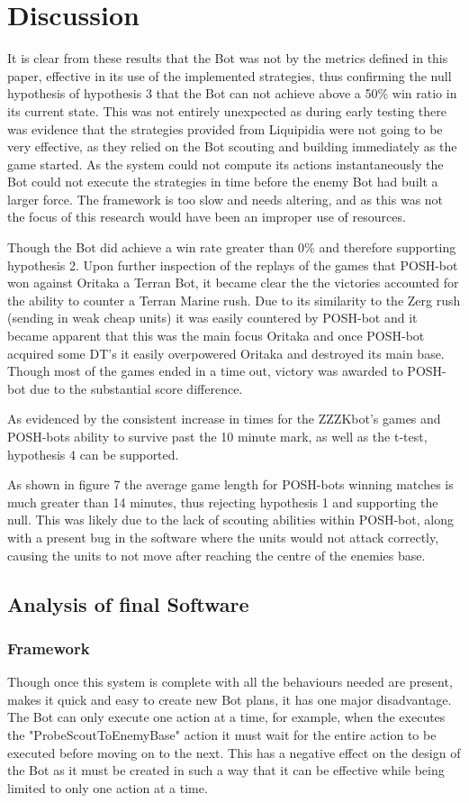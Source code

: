 \documentclass[journal]{IEEEtran}
\begin{document}
\section{Discussion}
It is clear from these results that the Bot was not by the metrics defined in this paper, effective in its use of the implemented strategies, thus confirming the null hypothesis of hypothesis 3 that the Bot can not achieve above a 50\% win ratio in its current state. This was not entirely unexpected as during early testing there was evidence that the strategies provided from Liquipidia were not going to be very effective, as they relied on the Bot scouting and building immediately as the game started. As the system could not compute its actions instantaneously the Bot could not execute the strategies in time before the enemy Bot had built a larger force. The framework is too slow and needs altering, and as this was not the focus of this research would have been an improper use of resources.

Though the Bot did achieve a win rate greater than 0\% and therefore supporting hypothesis 2. Upon further inspection of the replays of the games that POSH-bot won against Oritaka a Terran Bot, it became clear the the victories accounted for the ability to counter a Terran Marine rush. Due to its similarity to the Zerg rush (sending in weak cheap units) it was easily countered by POSH-bot and it became apparent that this was the main focus Oritaka and once POSH-bot acquired some DT's it easily overpowered Oritaka and destroyed its main base. Though most of the games ended in a time out, victory was awarded to POSH-bot due to the substantial score difference.

As evidenced by the consistent increase in times for the ZZZKbot's games and POSH-bots ability to survive past the 10 minute mark, as well as the t-test, hypothesis 4 can be supported. 

As shown in figure 7 the average game length for POSH-bots winning matches is much greater than 14 minutes, thus rejecting hypothesis 1 and supporting the null. This was likely due to the lack of scouting abilities within POSH-bot, along with a present bug in the software where the units would not attack correctly, causing the units to not move after reaching the centre of the enemies base. 

\subsection{Analysis of final Software}
\subsubsection{Framework}
Though once this system is complete with all the behaviours needed are present, makes it quick and easy to create new Bot plans, it has one major disadvantage. The Bot can only execute one action at a time, for example, when the executes the "ProbeScoutToEnemyBase" action it must wait for the entire action to be executed before moving on to the next. This has a negative effect on the design of the Bot as it must be created in such a way that it can be effective while being limited to only one action at a time.
\end{document}
